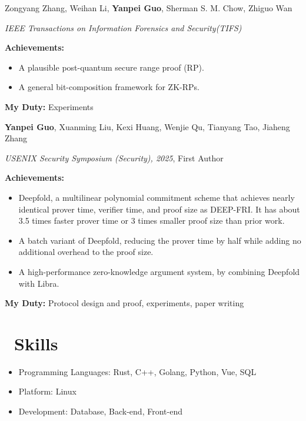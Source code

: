 \documentclass{resume}
\begin{document}
Zongyang Zhang, Weihan Li, \textbf{Yanpei Guo}, Sherman S. M. Chow, Zhiguo Wan

\textit{IEEE Transactions on Information Forensics and Security(TIFS)}

\textbf{Achievements:}
\begin{itemize}
  \item A plausible post-quantum secure range proof (RP).
  \item A general bit-composition framework for ZK-RPs.
\end{itemize}
\textbf{My Duty:} Experiments

\textbf{Yanpei Guo}, Xuanming Liu, Kexi Huang, Wenjie Qu, Tianyang Tao, Jiaheng Zhang

\textit{USENIX Security Symposium (Security), 2025}, First Author

\textbf{Achievements:}
\begin{itemize}
  \item Deepfold, a multilinear polynomial commitment scheme that achieves nearly identical prover time, verifier time, and proof size as DEEP-FRI.
  It has about 3.5 times faster prover time or 3 times smaller proof size than prior work.
  \item A batch variant of Deepfold, reducing the prover time by half while adding no additional overhead to the proof size.
  \item A high-performance zero-knowledge argument system, by combining Deepfold with Libra.
\end{itemize}
\textbf{My Duty:} Protocol design and proof, experiments, paper writing


\section{\faCogs\ Skills}
\begin{itemize}[parsep=0.5ex]
  \item Programming Languages: Rust, C++, Golang, Python, Vue, SQL
  \item Platform: Linux
  \item Development: Database, Back-end, Front-end
\end{itemize}
\end{document}
